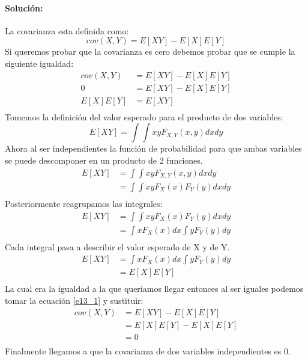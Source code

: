 \documentclass[12pt]{article}
\begin{document}
\paragraph{Solución: } La covarianza esta definida como:
\begin{equation}\label{e13_1}
	cov(X,Y)=E[XY] - E[X]E[Y]
\end{equation} 
Si queremos probar que la covarianza es cero debemos probar que se cumple la siguiente igualdad:
\begin{equation}
\begin{split}
cov(X,Y)&=E[XY] - E[X]E[Y]\\
0&=E[XY] - E[X]E[Y]\\
E[X]E[Y]&=E[XY]\\
\end{split}
\end{equation}
Tomemos la definición del valor esperado para el producto de dos variables:
\begin{equation}
	E[XY] = \int \int xyF_{X,Y}(x,y)dxdy 
\end{equation}
Ahora al ser independientes la función de probabilidad para que ambas variables se puede descomponer en un producto de 2 funciones. 
\begin{equation}
\begin{split}
E[XY] &= \int \int xyF_{X,Y}(x,y)dxdy\\
&= \int \int xyF_{X}(x)F_{Y}(y)dxdy\\
\end{split}
\end{equation}
Posteriormente reagrupamos las integrales:
\begin{equation}
\begin{split}
E[XY] &= \int \int xyF_{X}(x)F_{Y}(y)dxdy\\
&= \int xF_{X}(x)dx \int yF_{Y}(y)dy\\
\end{split}
\end{equation}
Cada integral pasa a describir el valor esperado de X y de Y.
\begin{equation}
\begin{split}
E[XY] &= \int xF_{X}(x)dx \int yF_{Y}(y)dy\\
&= E[X]E[Y]\\
\end{split}
\end{equation}
La cual era la igualdad a la que queríamos llegar entonces al ser iguales podemos tomar la ecuación \ref{e13_1} y sustituir:
\begin{equation}
\begin{split}
cov(X,Y)&=E[XY] - E[X]E[Y]\\
&= E[X]E[Y] - E[X]E[Y]\\
&= 0\\
\end{split}
\end{equation}
Finalmente llegamos a que la covarianza de dos variables independientes es 0.
\end{document}
